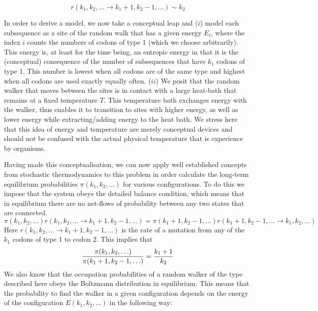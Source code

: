 \documentclass[a4paper,10pt]{paper}%
\newcommand{\one}{($i$) }
\newcommand{\two}{($ii$) }
\begin{document}
%
% 
\begin{equation}
r(k_1, k_2, \ldots \to k_1+1, k_2-1, \ldots) \sim k_2  
\end{equation}
%
%  
\par
In order to derive a model, we now  take a conceptual leap and   \one  model each subsequence as a site of the random walk that has a given energy $E_i$, where the index $i$ counts the numbers of codons of type 1 (which we choose arbitrarily). This energy is, at least for the time being, an entropic energy in that it is the (conceptual) consequence of  the number of subsequences that  have $k_1$ codons of type 1. This number is lowest when all codons are  of the same type and highest when all codons are used exactly equally often. \two We posit that the random walker  that moves between the sites  is in contact with a large heat-bath that remains at a fixed temperature $T$. This temperature bath exchanges energy with the walker, thus enables it  to transition to sites with higher energy, as well as lower energy while extracting/adding energy to the heat bath.   We stress here that this idea of energy and temperature are merely conceptual devices  and  should not be confused with the actual physical temperature that is experience by organisms.
\par
Having made this conceptualisation, we can now apply well established concepts from stochastic thermodynamics \cite{seifertreview} to this problem  in order  calculate the long-term equilibrium probabilities $\pi(k_1,k_2,\ldots)$ for various configurations. To do this we impose that the system obeys  the detailed balance condition, which  means that in equilibrium there are no net-flows of probability between any two states that are connected. 
%
% 
\begin{equation}
\pi (k_1, k_2, \ldots)  r(k_1, k_2, \ldots \to k_1+1, k_2-1, \ldots) =\pi(k_1+1, k_2-1, \ldots) r(k_1+1, k_2-1, \ldots \to  k_1, k_2, \ldots) 
\end{equation}
%
%
Here $r(k_1, k_2, \ldots \to k_1+1, k_2-1, \ldots)$ is the rate of a mutation from any of the $k_1$ codons of type 1 to codon 2. 
This implies that 
%
% 
\begin{equation}
{\pi (k_1, k_2, \ldots)\over \pi(k_1+1, k_2-1, \ldots)} 
=
{ k_1+1 \over k_2}
\end{equation}
%
% 
We also know that  the occupation probabilities of a  random walker of the type described here obeys  the  Boltzmann distribution in equilibrium. This means that  the probability to find  the walker  in a given configuration depends on the energy of the configuration $E(k_1, k_2, \ldots)$ in the following way: 
\end{document}
